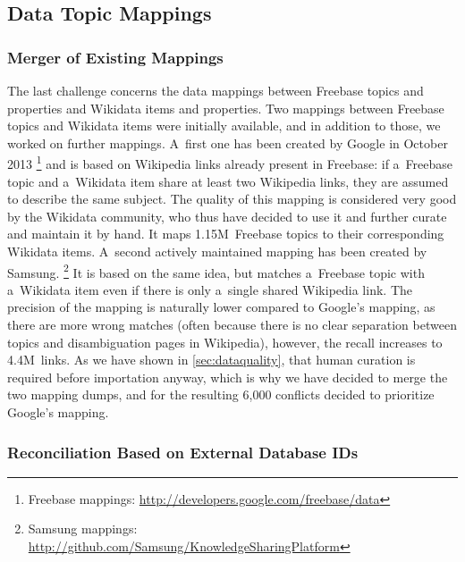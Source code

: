 \documentclass{acm_proc_article-sp}
\begin{document}
\subsection{Data Topic Mappings}

\subsubsection{Merger of Existing Mappings}

The last challenge concerns the data mappings between Freebase topics and properties
and Wikidata items and properties.
Two mappings between Freebase topics and Wikidata items were initially available,
and in addition to those, we worked on further mappings.
A~first one has been created by Google in October 2013%
\footnote{Freebase mappings: \url{http://developers.google.com/freebase/data}}
and is based on Wikipedia links already present in Freebase: if a~Freebase topic and
a~Wikidata item share at least two Wikipedia links, they are assumed to describe the same subject.
The quality of this mapping is considered very good by the Wikidata community,
who thus have decided to use it and further curate and maintain it by hand.
It maps 1.15M~Freebase topics to their corresponding Wikidata items.
A~second actively maintained mapping has been created by Samsung.%
\footnote{Samsung mappings: \url{http://github.com/Samsung/KnowledgeSharingPlatform}}
It is based on the same idea, but matches a~Freebase topic with a~Wikidata item
even if there is only a~single shared Wikipedia link.
The precision of the mapping is naturally lower compared to Google's mapping,
as there are more wrong matches (often because there is no clear separation between topics
and disambiguation pages in Wikipedia), however, the recall increases to 4.4M~links.
As we have shown in \autoref{sec:dataquality},
that human curation is required before importation anyway,
which is why we have decided to merge the two mapping dumps,
and for the resulting 6,000 conflicts decided to prioritize Google's mapping.

\subsubsection{Reconciliation Based on External Database IDs}
\end{document}
